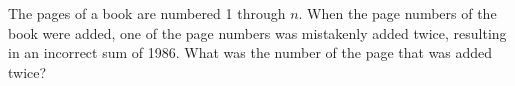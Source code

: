 The pages of a book are numbered 1 through $n$. When the page numbers of the book were added, one of the page numbers was mistakenly added twice, resulting in an incorrect sum of 1986. What was the number of the page that was added twice?